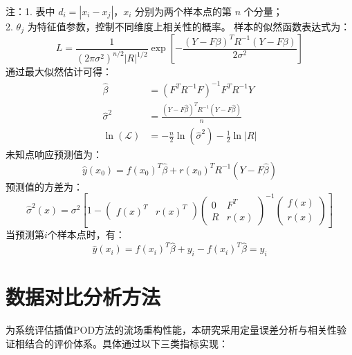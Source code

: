 注：1. 表中 \( d_i = |x_i - x_j| \)，\( x_i \) 分别为两个样本点的第 \( n \) 个分量；\\
2. \( \theta_j \) 为特征值参数，控制不同维度上相关性的概率。
样本的似然函数表达式为：
\begin{equation}
    L = \frac{1}{(2\pi\sigma^2)^{n/2}|R|^{1/2}} \exp\left[-\frac{(Y-F\beta)^T R^{-1}(Y-F\beta)}{2\sigma^2}\right]
    \label{eq:2.7}
\end{equation}
通过最大似然估计可得：
\begin{align}
    \hat{\beta} &= (F^T R^{-1} F)^{-1} F^T R^{-1} Y
    \label{eq:2.8} \\
    \hat{\sigma}^2 &= \frac{(Y-F\hat{\beta})^T R^{-1} (Y-F\hat{\beta})}{n}
    \label{eq:2.9} \\
    \ln(\mathcal{L}) &= -\frac{n}{2} \ln(\hat{\sigma}^2) - \frac{1}{2} \ln |R|
    \label{eq:2.10}
\end{align}
未知点响应预测值为：
\begin{equation}
    \hat{y}(x_0) = f(x_0)^T \hat{\beta} + r(x_0)^T R^{-1} (Y-F\hat{\beta})
    \label{eq:2.11}
\end{equation}
预测值的方差为：
\begin{equation}
    \hat{\sigma}^2(x) = \sigma^2 \left[ 1 - \begin{pmatrix} f(x)^T & r(x)^T \end{pmatrix} \begin{pmatrix} 0 & F^T \\ R & r(x) \end{pmatrix}^{-1} \begin{pmatrix} f(x) \\ r(x) \end{pmatrix} \right]
    \label{eq:2.12}
\end{equation}
当预测第\( i \)个样本点时，有：
\begin{equation}
    \hat{y}(x_i) = f(x_i)^T \hat{\beta} + y_i - f(x_i)^T \hat{\beta} = y_i
    \label{eq:2.14}
\end{equation}
\section{数据对比分析方法}
\label{sec:4.1}
为系统评估插值POD方法的流场重构性能，本研究采用定量误差分析与相关性验证相结合的评价体系。具体通过以下三类指标实现：

